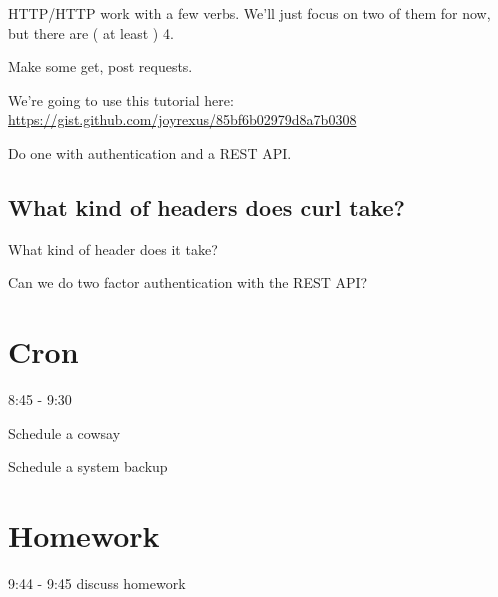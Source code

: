 \documentclass[12pt]{article}
\begin{document}
HTTP/HTTP work with a few verbs. We'll just focus on two of them for now, but there are ( at least ) 4. 

Make some get, post requests. 

We're going to use this tutorial here:
\url{https://gist.github.com/joyrexus/85bf6b02979d8a7b0308}

Do one with authentication and a REST API.

\subsection{What kind of headers does curl take?}
What kind of header does it take?

Can we do two factor authentication with the REST API?

\subsection{}

\section{Cron}
8:45 - 9:30

Schedule a cowsay

Schedule a system backup

\section{Homework}
9:44 - 9:45 discuss homework
\end{document}
